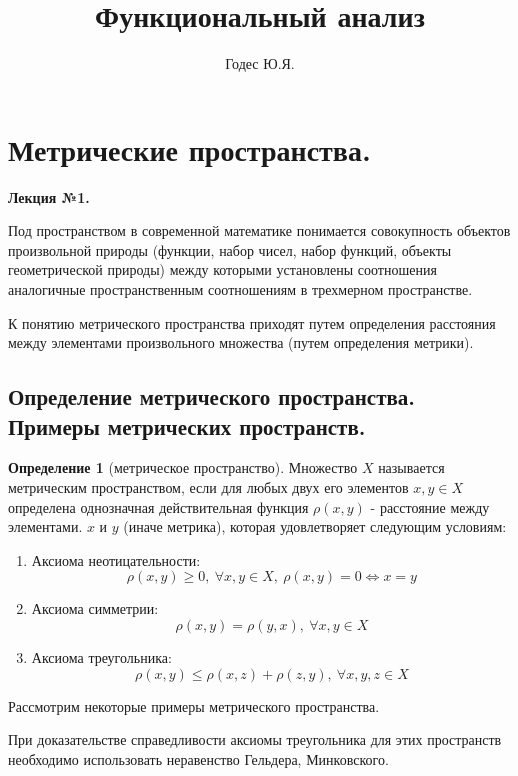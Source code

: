 \documentclass[14pt,a4paper]{extarticle}
\title{\textbf{Функциональный анализ}}
\author{Годес Ю.Я.}
\date{}
\theoremstyle{definition}
\newtheorem{definition}{Определение}[section]
\theoremstyle{remark}
\renewcommand{\[}{\begin{dmath*}[compact]}
\renewcommand{\]}{\end{dmath*}}
\newcommand{\be}{\begin{enumerate}}
\newcommand{\ee}{\end{enumerate}}
\newcommand{\sep}{ , \ \allowbreak }
\begin{document}
\sloppy
\maketitle

\tableofcontents

\section{Метрические пространства.} \label{sec:mp}

\textbf{Лекция №1.}

Под пространством в современной математике понимается совокупность объектов
произвольной природы (функции, набор чисел, набор функций, объекты
геометрической природы) между которыми установлены соотношения аналогичные
пространственным соотношениям в трехмерном пространстве.

К понятию метрического пространства приходят путем определения расстояния между
элементами произвольного множества (путем определения метрики).

\subsection{Определение метрического пространства.
Примеры метрических пространств.}

\begin{definition}[метрическое пространство]
  Множество $X$ называется метрическим пространством,
  если для любых двух его элементов $x, y \in X$
  определена однозначная действительная функция
  $\rho(x, y)$ - расстояние между элементами.
  $x$ и $y$ (иначе метрика), которая удовлетворяет следующим условиям:

  \be
    \item Аксиома неотицательности:
    \[ {\rho(x, y) \geq 0} \sep {\forall x, y \in X} \sep
    {\rho(x, y) = 0} \Leftrightarrow {x = y} \]
    \item Аксиома симметрии:
    \[{\rho(x, y) = \rho(y, x)} \sep {\forall x, y \in X}\]
    \item Аксиома треугольника:
    \[\rho(x, y) \leq {\rho(x, z) + \rho(z, y)} \sep
    {\forall x, y, z \in X}\]
  \ee
\end{definition}

Рассмотрим некоторые примеры метрического пространства.

При доказательстве справедливости аксиомы треугольника для этих пространств
необходимо использовать неравенство Гельдера, Минковского.
\end{document}
